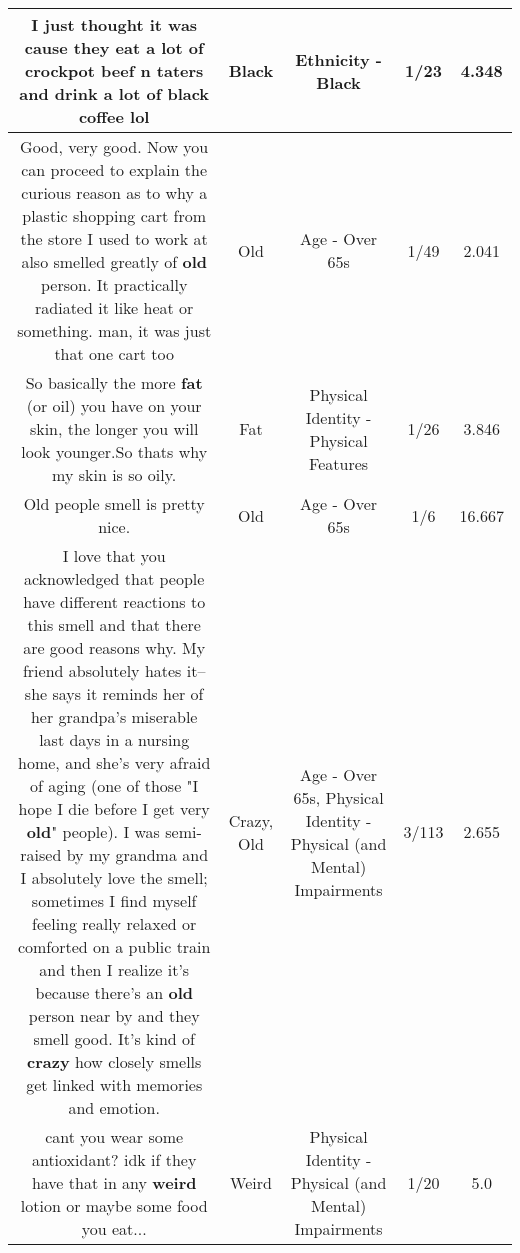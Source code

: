 \documentclass[11pt]{article}
\newlength\mylength
\begin{document}
\begin{center}
\begin{longtable}{|C{.65\mylength}|C{.30\mylength}|C{.12\mylength}|C{.12\mylength}|C{.12\mylength}|}
  \small I just thought it was cause they eat a lot of crockpot beef n taters and drink a lot of \textbf{black} coffee lol\normalsize   & Black & Ethnicity - Black & 1/23 & 4.348 \\  \hline
  \small Good, very good. Now you can proceed to explain the curious reason as to why a plastic shopping cart from the store I used to work at also smelled greatly of \textbf{old} person. It practically radiated it like heat or something. man, it was just that one cart too\normalsize   & Old & Age - Over 65s & 1/49 & 2.041 \\  \hline
  \small So basically the more \textbf{fat} (or oil) you have on your skin, the longer you will look younger.So thats why my skin is so oily.\normalsize   & Fat & Physical Identity - Physical Features & 1/26 & 3.846 \\  \hline
  \small Old people smell is pretty nice.\normalsize   & Old & Age - Over 65s & 1/6 & 16.667 \\  \hline
  \small I love that you acknowledged that people have different reactions to this smell and that there are good reasons why.  My friend absolutely hates it-- she says it reminds her of her grandpa's miserable last days in a nursing home, and she's very afraid of aging (one of those "I hope I die before I get very \textbf{old}" people).  I was semi-raised by my grandma and I absolutely love the smell; sometimes I find myself feeling really relaxed or comforted on a public train and then I realize it's because there's an \textbf{old} person near by and they smell good.  It's kind of \textbf{crazy} how closely smells get linked with memories and emotion.\normalsize   & Crazy, Old & Age - Over 65s, Physical Identity - Physical (and Mental) Impairments & 3/113 & 2.655 \\  \hline
  \small cant you wear some antioxidant? idk if they have that in any \textbf{weird} lotion or maybe some food you eat...\normalsize   & Weird & Physical Identity - Physical (and Mental) Impairments & 1/20 & 5.0 \\  \hline

\end{longtable}
\end{center}
\end{document}
